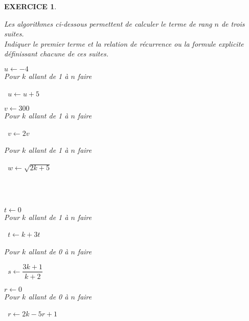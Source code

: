 \documentclass[a4paper]{article}   %
\renewcommand{\(}{\left(}
\renewcommand{\)}{\right)}
\newtheorem{EXO}{\large EXERCICE }
\newenvironment{EX}   { \setcounter{ques}{0} \begin{EXO} \hrulefill ~\vspace{0.3cm}

\normalfont}    {\end{EXO} \medskip}
\newcommand{\f}{\dfrac} 	%
\begin{document}
\begin{EX} Les algorithmes ci-dessous permettent de calculer le terme de rang $n$ de trois suites. \\
Indiquer le premier terme et la relation de récurrence ou la formule explicite définissant chacune de ces suites.\\

\begin{Sbox}\begin{minipage}{0.25\linewidth}
$u \leftarrow -4$ \\
Pour $k$ allant de 1 à $n$ faire

~\qquad  $u \leftarrow u+5$
\end{minipage}\end{Sbox} \fbox{\TheSbox} \qquad \begin{Sbox}\begin{minipage}{0.25\linewidth}
$v \leftarrow 300$ \\
Pour $k$ allant de 1 à $n$ faire

~\qquad  $v \leftarrow 2v$
\end{minipage}\end{Sbox} \fbox{\TheSbox} \qquad \begin{Sbox}\begin{minipage}{0.25\linewidth}
Pour $k$ allant de 1 à $n$ faire

~\qquad  $w \leftarrow \sqrt{2k+5}$
\end{minipage}\end{Sbox} \fbox{\TheSbox} \\
~~\\

\begin{Sbox}\begin{minipage}{0.25\linewidth}
$t \leftarrow 0$ \\
Pour $k$ allant de 1 à $n$ faire

~\qquad  $t \leftarrow k+3t$
\end{minipage}\end{Sbox} \fbox{\TheSbox} \qquad \begin{Sbox}\begin{minipage}{0.25\linewidth}
Pour $k$ allant de 0 à $n$ faire

~\qquad  $s \leftarrow \f{3k+1}{k+2}$
\end{minipage}\end{Sbox} \fbox{\TheSbox} \qquad \begin{Sbox}\begin{minipage}{0.25\linewidth}
$r \leftarrow 0$ \\
Pour $k$ allant de 0 à $n$ faire

~\qquad  $r \leftarrow 2k-5r+1$
\end{minipage}\end{Sbox} \fbox{\TheSbox}
\end{EX}
\end{document}
